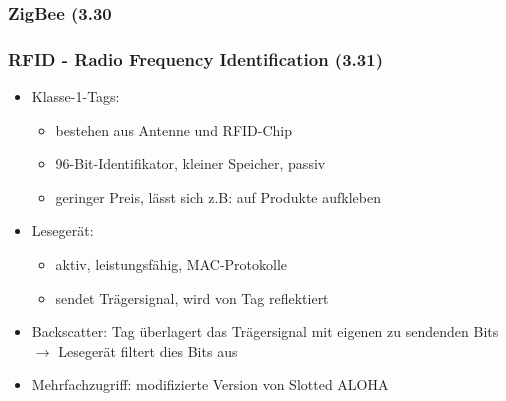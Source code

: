 \subsubsection{ZigBee (3.30}
\subsubsection{RFID - Radio Frequency Identification (3.31)}
\begin{itemize}
	\item Klasse-1-Tags:
	\begin{itemize}
		\item bestehen aus Antenne und RFID-Chip
		\item 96-Bit-Identifikator, kleiner Speicher, passiv
		\item geringer Preis, lässt sich z.B: auf Produkte aufkleben
	\end{itemize}
	\item Lesegerät:
	\begin{itemize}
		\item aktiv, leistungsfähig, MAC-Protokolle
		\item sendet Trägersignal, wird von Tag reflektiert
	\end{itemize}
	\item Backscatter: Tag überlagert das Trägersignal mit eigenen zu sendenden Bits \(\to\) Lesegerät filtert dies Bits aus
	\item Mehrfachzugriff: modifizierte Version von Slotted ALOHA
\end{itemize}
